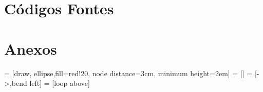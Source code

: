 \section{Códigos Fontes}\label{src}

%
\begin{multicols}{2}    %

\hypertarget{main}{
Código principal},label=main]{../trunk/main.c} }

\end{multicols}

\onecolumn
\section{Anexos}\label{anexo}



 = [draw, ellipse,fill=red!20, node distance=3cm,
    minimum height=2em]
 = []   
 = [->,bend left] %
 = [loop above]

